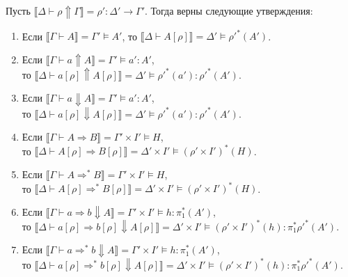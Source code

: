 \documentclass{amsart}
\theoremstyle{definition}
\theoremstyle{remark}
\newcommand{\red}{\Rightarrow}
\renewcommand{\ll}{\llbracket}
\newcommand{\rr}{\rrbracket}
\numberwithin{figure}{section}
\begin{document}
\begin{lem}
Пусть $\ll \Delta \vdash \rho \Uparrow \Gamma \rr = \rho' : \Delta' \to \Gamma'$.
Тогда верны следующие утверждения:
\begin{enumerate}
\item Если $\ll \Gamma \vdash A \rr = \Gamma' \models A'$, то $\ll \Delta \vdash A[\rho] \rr = \Delta' \models \rho'^*(A')$.
\item Если $\ll \Gamma \vdash a \Uparrow A \rr = \Gamma' \models a' : A'$, \\
    то $\ll \Delta \vdash a[\rho] \Uparrow A[\rho] \rr = \Delta' \models \rho'^*(a') : \rho'^*(A')$.
\item Если $\ll \Gamma \vdash a \Downarrow A \rr = \Gamma' \models a' : A'$, \\
    то $\ll \Delta \vdash a[\rho] \Downarrow A[\rho] \rr = \Delta' \models \rho'^*(a') : \rho'^*(A')$.
\item Если $\ll \Gamma \vdash A \red B \rr = \Gamma' \times I' \models H$, \\
    то $\ll \Delta \vdash A[\rho] \red B[\rho] \rr = \Delta' \times I' \models (\rho' \times I')^*(H)$.
\item Если $\ll \Gamma \vdash A \red^* B \rr = \Gamma' \times I' \models H$, \\
    то $\ll \Delta \vdash A[\rho] \red^* B[\rho] \rr = \Delta' \times I' \models (\rho' \times I')^*(H)$.
\item Если $\ll \Gamma \vdash a \red b \Downarrow A \rr = \Gamma' \times I' \models h : \pi_1^*(A')$, \\
    то $\ll \Delta \vdash a[\rho] \red b[\rho] \Downarrow A[\rho] \rr = \Delta' \times I' \models (\rho' \times I')^*(h) : \pi_1^* \rho'^*(A')$.
\item Если $\ll \Gamma \vdash a \red^* b \Downarrow A \rr = \Gamma' \times I' \models h : \pi_1^*(A')$, \\
    то $\ll \Delta \vdash a[\rho] \red^* b[\rho] \Downarrow A[\rho] \rr = \Delta' \times I' \models (\rho' \times I')^*(h) : \pi_1^* \rho'^*(A')$.
\end{enumerate}
\end{lem}
\end{document}

